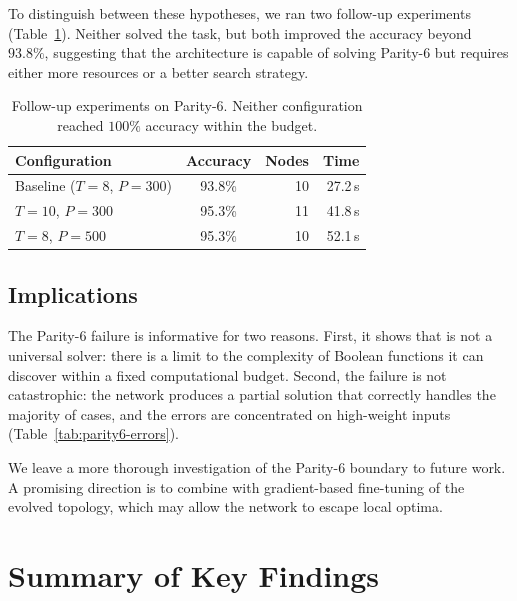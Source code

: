 To distinguish between these hypotheses, we ran two follow-up
experiments (Table~\ref{tab:parity6-followups}). Neither solved the
task, but both improved the accuracy beyond $93.8\%$, suggesting that
the architecture is capable of solving Parity-6 but requires either
more resources or a better search strategy.

\begin{table}[h]
  \centering
  \small
  \caption{Follow-up experiments on Parity-6. Neither configuration
    reached $100\%$ accuracy within the budget.}
  \label{tab:parity6-followups}
  \begin{tabular}{lcrr}
    \toprule
    \textbf{Configuration} & \textbf{Accuracy} & \textbf{Nodes} & \textbf{Time} \\
    \midrule
    Baseline ($T = 8$, $P = 300$) & 93.8\% & 10 & 27.2\,s \\
    $T = 10$, $P = 300$           & 95.3\% & 11 & 41.8\,s \\
    $T = 8$, $P = 500$            & 95.3\% & 10 & 52.1\,s \\
    \bottomrule
  \end{tabular}
\end{table}

\subsection{Implications}

The Parity-6 failure is informative for two reasons. First, it shows
that \modnet{} is not a universal solver: there is a limit to the
complexity of Boolean functions it can discover within a fixed
computational budget. Second, the failure is not catastrophic: the
network produces a partial solution that correctly handles the
majority of cases, and the errors are concentrated on high-weight
inputs (Table~\ref{tab:parity6-errors}).

We leave a more thorough investigation of the Parity-6 boundary to
future work. A promising direction is to combine \modnet{} with
gradient-based fine-tuning of the evolved topology, which may allow
the network to escape local optima.

\section{Summary of Key Findings}
\label{sec:results-summary}

